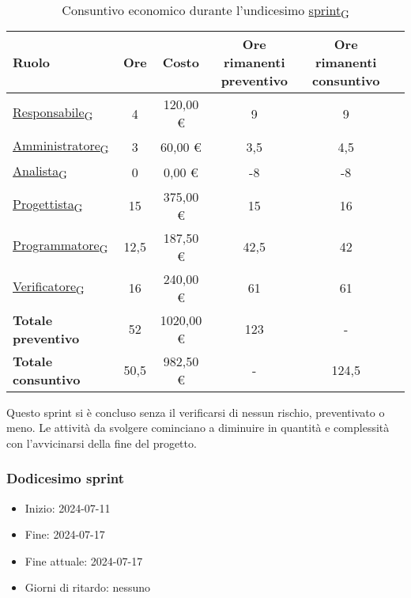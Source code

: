 \begin{table}[!h]
    \centering
    \begin{tabular}{ | l | c | c | c | c | c | }
        \hline
        \textbf{Ruolo} & \textbf{Ore} & \textbf{Costo} & \textbf{Ore rimanenti preventivo} & \textbf{Ore rimanenti consuntivo} \\
        \hline
        \href{https://7last.github.io/docs/pb/documentazione-interna/glossario\#responsabile}{Responsabile\textsubscript{G}}     &  4   &  120,00 € &   9   &   9   \\
        \href{https://7last.github.io/docs/pb/documentazione-interna/glossario\#amministratore}{Amministratore\textsubscript{G}} &  3   &   60,00 € &   3,5 &   4,5 \\
        \href{https://7last.github.io/docs/pb/documentazione-interna/glossario\#analista}{Analista\textsubscript{G}}             &  0   &    0,00 € &  -8   &  -8   \\
        \href{https://7last.github.io/docs/pb/documentazione-interna/glossario\#progettista}{Progettista\textsubscript{G}}       & 15   &  375,00 € &  15   &  16   \\
        \href{https://7last.github.io/docs/pb/documentazione-interna/glossario\#programmatore}{Programmatore\textsubscript{G}}   & 12,5 &  187,50 € &  42,5 &  42   \\
        \href{https://7last.github.io/docs/pb/documentazione-interna/glossario\#verificatore}{Verificatore\textsubscript{G}}     & 16   &  240,00 € &  61   &  61   \\
        \hline
        \textbf{Totale preventivo} & 52   & 1020,00 € & 123   &   -   \\
        \hline
        \textbf{Totale consuntivo} & 50,5 &  982,50 € &   -   & 124,5 \\
        \hline
    \end{tabular}
    \caption{Consuntivo economico durante l'undicesimo \href{https://7last.github.io/docs/pb/documentazione-interna/glossario\#sprint}{sprint\textsubscript{G}}}
\end{table}

Questo sprint si è concluso senza il verificarsi di nessun rischio, preventivato o meno. Le attività da svolgere cominciano a diminuire in quantità e complessità con l'avvicinarsi della fine del progetto. 


\newpage
\subsubsection{Dodicesimo sprint}
\begin{itemize}
    \item Inizio: 2024-07-11
    \item Fine: 2024-07-17
    \item Fine attuale: 2024-07-17
    \item Giorni di ritardo: nessuno
\end{itemize}

